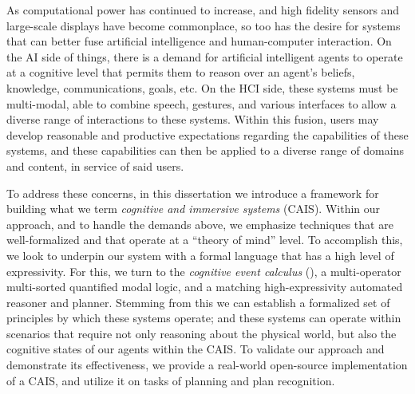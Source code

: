  

As computational power has continued to increase, and high fidelity sensors and
large-scale displays have become commonplace, so too has the
desire for
systems that can better fuse artificial intelligence and
human-computer interaction.  On the AI side of things, there is a
demand for artificial intelligent agents to operate at a cognitive
level that permits them to reason over an agent's beliefs, knowledge,
communications, goals, etc.  On the HCI side, these systems must be
multi-modal, able to combine speech, gestures, and various interfaces
to allow a diverse range of interactions to these systems.  Within
this fusion, users may develop reasonable and productive expectations
regarding the capabilities of these systems, and these capabilities
can then be applied to a diverse range of domains and content, in
service of said users.

To address these concerns, in this dissertation we introduce a
framework for building what we term \textit{cognitive and immersive
systems} (CAIS).  Within our approach, and to handle the demands
above, we emphasize techniques that are well-formalized and that
operate at a ``theory of mind'' level.  To accomplish this, we look to
underpin our system with a formal language that has a high level of
expressivity.  For this, we turn to the \textit{cognitive event
calculus} (\CEC), a multi-operator multi-sorted quantified modal
logic, and a matching high-expressivity automated reasoner and
planner.  Stemming from this we can establish a formalized set of
principles by which these systems operate; and these systems can
operate within scenarios that require not only reasoning about the
physical world, but also the cognitive states of our agents within the
CAIS.  To validate our approach and demonstrate its effectiveness, we
provide a real-world open-source implementation of a CAIS, and utilize
it on tasks of planning and plan recognition.